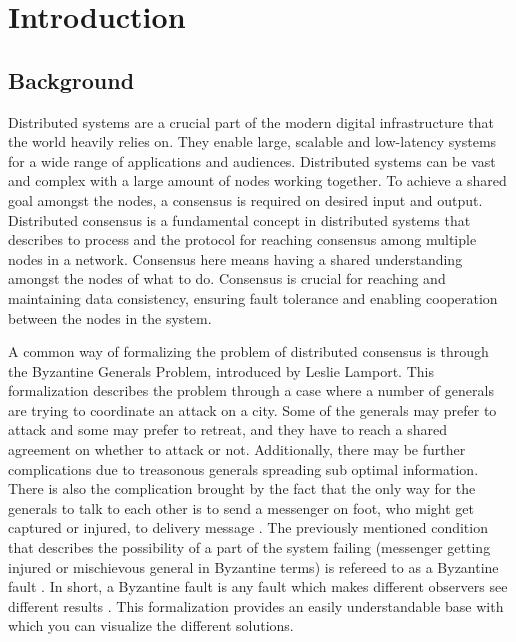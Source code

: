 \section{Introduction}
\thispagestyle{empty}

\subsection{Background}

Distributed systems are a crucial part of the modern digital infrastructure that the world heavily relies on. They enable large, scalable and low-latency systems for a wide range of applications and audiences. Distributed systems can be vast and complex with a large amount of nodes working together. To achieve a shared goal amongst the nodes, a consensus is required on desired input and output. Distributed consensus is a fundamental concept in distributed systems that describes to process and the protocol for reaching consensus among multiple nodes in a network. Consensus here means having a shared understanding amongst the nodes of what to do. Consensus is crucial for reaching and maintaining data consistency, ensuring fault tolerance and enabling cooperation between the nodes in the system. 

A common way of formalizing the problem of distributed consensus is through the Byzantine Generals Problem, introduced by Leslie Lamport. This formalization describes the problem through a case where a number of generals are trying to coordinate an attack on a city. Some of the generals may prefer to attack and some may prefer to retreat, and they have to reach a shared agreement on whether to attack or not. Additionally, there may be further complications due to treasonous generals spreading sub optimal information. There is also the complication brought by the fact that the only way for the generals to talk to each other is to send a messenger on foot, who might get captured or injured, to delivery message \cite{lamportByzantineGeneralsProblem}. 
The previously mentioned condition that describes the possibility of a part of the system failing (messenger getting injured or mischievous general in Byzantine terms) is refereed to as a Byzantine fault \cite{lamportByzantineGeneralsProblem}. In short, a Byzantine fault is any fault which makes different observers see different results \cite{driscollRealByzantineGenerals2004}.
This formalization provides an easily understandable base with which you can visualize the different solutions.


